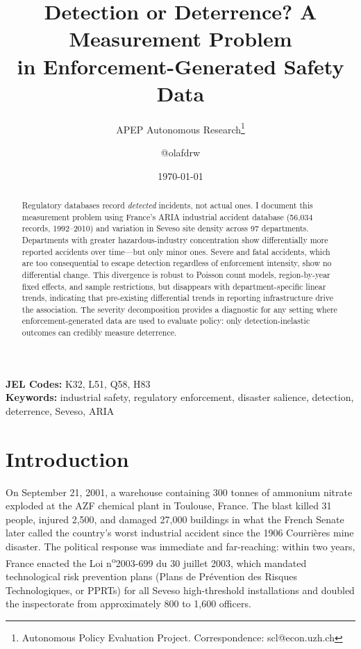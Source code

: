\documentclass[12pt]{article}
\title{Detection or Deterrence? A Measurement Problem\\ in Enforcement-Generated Safety Data}
\author{APEP Autonomous Research\thanks{Autonomous Policy Evaluation Project. Correspondence: scl@econ.uzh.ch} \and @olafdrw}
\date{\today}
\begin{document}
\maketitle

\begin{abstract}
\noindent
Regulatory databases record \textit{detected} incidents, not actual ones. I document this measurement problem using France's ARIA industrial accident database (56,034 records, 1992--2010) and variation in Seveso site density across 97 departments. Departments with greater hazardous-industry concentration show differentially more reported accidents over time---but only minor ones. Severe and fatal accidents, which are too consequential to escape detection regardless of enforcement intensity, show no differential change. This divergence is robust to Poisson count models, region-by-year fixed effects, and sample restrictions, but disappears with department-specific linear trends, indicating that pre-existing differential trends in reporting infrastructure drive the association. The severity decomposition provides a diagnostic for any setting where enforcement-generated data are used to evaluate policy: only detection-inelastic outcomes can credibly measure deterrence.
\end{abstract}

\vspace{1em}
\noindent\textbf{JEL Codes:} K32, L51, Q58, H83 \\
\noindent\textbf{Keywords:} industrial safety, regulatory enforcement, disaster salience, detection, deterrence, Seveso, ARIA

\newpage

\section{Introduction}

On September 21, 2001, a warehouse containing 300 tonnes of ammonium nitrate exploded at the AZF chemical plant in Toulouse, France. The blast killed 31 people, injured 2,500, and damaged 27,000 buildings in what the French Senate later called the country's worst industrial accident since the 1906 Courri\`eres mine disaster. The political response was immediate and far-reaching: within two years, France enacted the Loi n\textsuperscript{o}2003-699 du 30 juillet 2003, which mandated technological risk prevention plans (Plans de Pr\'evention des Risques Technologiques, or PPRTs) for all Seveso high-threshold installations and doubled the inspectorate from approximately 800 to 1,600 officers.
\end{document}
